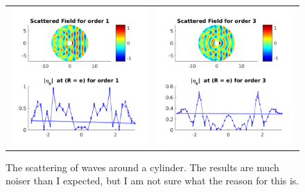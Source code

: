 \documentclass{article}
\begin{document}
\begin{figure}[!ht]
\centering
\begin{tabular}{c c}
\includegraphics[scale=0.8]{wave_1.pdf} &
\includegraphics[scale=0.8]{wave_3.pdf}
\end{tabular}
\caption{The scattering of waves around a cylinder. The results are much noiser than I expected, but I am not sure what the reason for this is.}
\label{fig:wave}
\end{figure}
\end{document}
